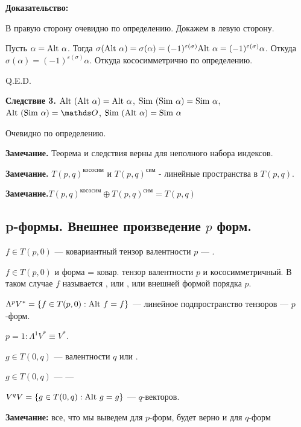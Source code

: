 \textbf{Доказательство:}

В правую сторону очевидно по определению. Докажем в левую сторону.

Пусть $\alpha = \text{Alt } \alpha$. Тогда $\sigma(\text{Alt } \alpha) = \sigma(\alpha) = (-1)^{\varepsilon(\sigma)}\text{Alt } \alpha = (-1)^{\varepsilon(\sigma)}\alpha$. Откуда $\sigma(\alpha) = (-1)^{\varepsilon(\sigma)} \alpha$. Откуда кососимметрично по определению.

\hfill Q.E.D.

\textbf{Следствие 3.} $\text{Alt }(\text{Alt } \alpha) = \text{Alt } \alpha$, $\text{Sim }(\text{Sim } \alpha) = \text{Sim } \alpha$, $\Alt(\Sim \alpha) = \zero$, $\text{Sim }(\text{Alt } \alpha) = \text{Sim } \alpha$

Очевидно по определению.

\textbf{Замечание.} Теорема и следствия верны для неполного набора индексов.

\textbf{Замечание.} $T(p,q)^{\text{кососим}}$ и  $T(p,q)^{\text{сим}}$ - линейные пространства в $T(p,q)$.

\textbf{Замечание.}$T(p,q)^{\text{кососим}} \oplus T(p,q)^{\text{сим}} = T(p,q)$

\pagebreak

\subsection{p-формы. Внешнее произведение $p$ форм.}

 $f \in T(p,0)$ --- ковариантный тензор валентности $p$ --- .

$f \in T(p,0)$ и  форма = ковар. тензор валентности $p$ и кососимметричный. В таком случае $f$ называется , или , или внешней формой порядка $p$. 

$\Lambda^pV^* = \{f \in T(p,0): \text{Alt } f = f\}$ --- линейное подпространство тензоров ---  $p$-форм.

$p = 1: \Lambda^1 V^* \equiv V^*$.

 $g\in T(0,q)$ ---  валентности $q$ или .

$g \in T(0,q)$ ---  --- 

$V^qV = \{g\in T(0,q): \text{Alt } g =g\}$ ---  $q$-векторов.

\textbf{Замечание:} все, что мы выведем для $p$-форм, будет верно и для $q$-форм

